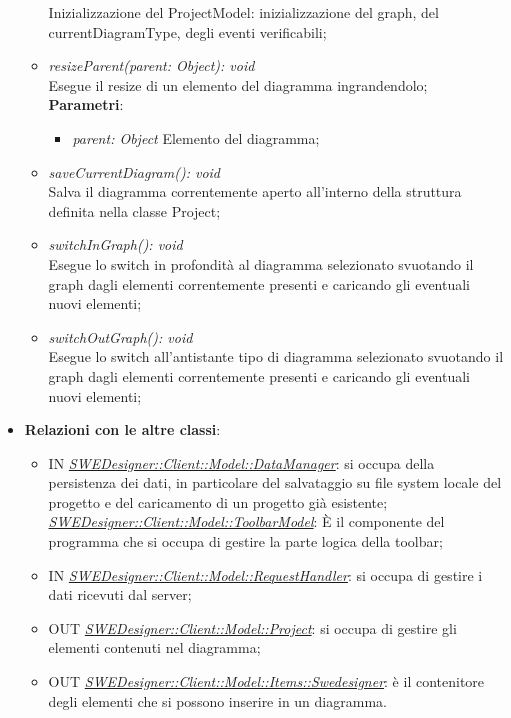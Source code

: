 \documentclass[../DefinizioneDiProdotto.tex]{subfiles}
\begin{document}
\begin{itemize}
\begin{itemize}
							Inizializzazione del ProjectModel: inizializzazione del graph, del currentDiagramType, degli eventi verificabili; \\
							\item \emph{resizeParent(parent: Object): void} \\
							Esegue il resize di un elemento del diagramma ingrandendolo; \\
								\textbf{Parametri}:
								\begin{itemize}
									\item \emph{parent: Object}
									Elemento del diagramma; \\
								\end{itemize}
							\item \emph{saveCurrentDiagram(): void} \\
							Salva il diagramma correntemente aperto all'interno della struttura definita nella classe Project; \\
							\item \emph{switchInGraph(): void} \\
							Esegue lo switch in profondità al diagramma selezionato svuotando il graph dagli elementi correntemente presenti e caricando gli eventuali nuovi elementi; \\
							\item \emph{switchOutGraph(): void} \\
							Esegue lo switch all'antistante tipo di diagramma selezionato svuotando il graph dagli elementi correntemente presenti e caricando gli eventuali nuovi elementi; \\
						\end{itemize}
						\item \textbf{Relazioni con le altre classi}:
						\begin{itemize}
							\item IN \hyperlink{SWEDesigner::Client::Model::DataManager}{\emph{SWEDesigner::Client::Model::DataManager}}: si occupa della persistenza dei dati, in particolare del salvataggio su file system locale del progetto e del caricamento di un progetto già esistente;
							\hyperlink{SWEDesigner::Client::Model::ToolbarModel}{\emph{SWEDesigner::Client::Model::ToolbarModel}}: È il componente del programma che si occupa di gestire la parte logica della toolbar;
							\item IN \hyperlink{SWEDesigner::Client::Model::RequestHandler}{\emph{SWEDesigner::Client::Model::RequestHandler}}: si occupa di gestire i dati ricevuti dal server;
							\item OUT \hyperlink{SWEDesigner::Client::Model::Project}{\emph{SWEDesigner::Client::Model::Project}}: si occupa di gestire gli elementi contenuti nel diagramma;
							\item OUT \hyperlink{SWEDesigner::Client::Model::Items::Swedesigner}{\emph{SWEDesigner::Client::Model::Items::Swedesigner}}: è il contenitore degli elementi che si possono inserire in un diagramma.
						\end{itemize}
					\end{itemize}
\end{document}
